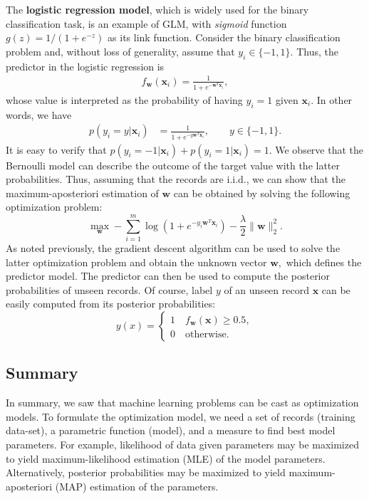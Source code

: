 \documentclass[11pt]{article}
\begin{document}
The \textbf{logistic regression model}, which is widely used for the binary classification task, is an example of GLM, with \emph{sigmoid} function \(g(z)=1/(1+e^{-z})\) as its link function. Consider the binary classification problem and, without loss of generality, assume that \(y_i\in\{-1,1\}\). Thus, the predictor in the logistic regression is  
\begin{align*}
  f_{\boldsymbol{w}}(\boldsymbol{x}_i)=\frac{1}{1+e^{-\boldsymbol{w}^T\boldsymbol{x}_i}},
\end{align*}
whose value is interpreted as the probability of having \(y_i=1\) given \(\boldsymbol{x}_i\). In other words, we have
\begin{align*}
p(y_i=y|\boldsymbol{x}_i) &= \frac{1}{1+e^{-y\boldsymbol{w}^T\boldsymbol{x}_i}},\qquad y\in\{-1,1\}.
\end{align*}
It is easy to verify that \(p(y_i=-1|\boldsymbol{x}_i) + p(y_i=1|\boldsymbol{x}_i) = 1\). We observe that the Bernoulli model can describe the outcome of the target value with the latter probabilities. Thus, assuming that the records are i.i.d., we can show that the maximum-aposteriori estimation of \(\boldsymbol{w}\) can be obtained by solving the following optimization problem:
\[
\max_{\boldsymbol{w}} -\sum_{i=1}^m \log(1+e^{-y_i\boldsymbol{w}^T\boldsymbol{x}_i}) -\frac{\lambda}{2}\|\boldsymbol{w}\|_2^2.
\]
As noted previously, the gradient descent algorithm can be used to solve the latter optimization problem and obtain the unknown vector \(\boldsymbol{w},\) which defines the predictor model. The predictor can then be used to compute the posterior probabilities of unseen records. Of course, label \(y\) of an unseen record \(\boldsymbol{x}\) can be easily computed from its posterior probabilities:
\[
  y(x)=\begin{cases}
          1\quad f_{\boldsymbol{w}}(\boldsymbol{x}) \ge 0.5,\\
          0\quad \text{otherwise.}
         \end{cases}
\] 

\subsection{Summary}
\label{sec:orgheadline5}
In summary, we saw that machine learning problems can be cast as optimization models. To formulate the optimization model, we need a set of records (training data-set), a parametric function (model), and a measure to find best model parameters. For example, likelihood of data given parameters may be maximized to yield maximum-likelihood estimation (MLE) of the model parameters. Alternatively, posterior probabilities may be maximized to yield maximum-aposteriori (MAP) estimation of the parameters. 
\end{document}
